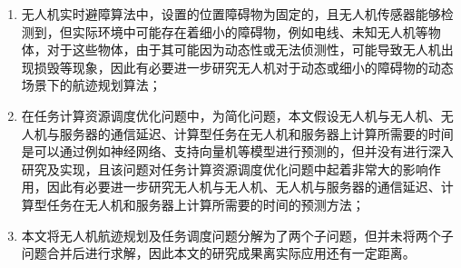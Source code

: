 \begin{enumerate}[leftmargin=2em]
    \item {无人机实时避障算法中，设置的位置障碍物为固定的，且无人机传感器能够检测到，但实际环境中可能存在着细小的障碍物，例如电线、未知无人机等物体，对于这些物体，由于其可能因为动态性或无法侦测性，可能导致无人机出现损毁等现象，因此有必要进一步研究无人机对于动态或细小的障碍物的动态场景下的航迹规划算法；}

    \item {在任务计算资源调度优化问题中，为简化问题，本文假设无人机与无人机、无人机与服务器的通信延迟、计算型任务在无人机和服务器上计算所需要的时间是可以通过例如神经网络、支持向量机等模型进行预测的，但并没有进行深入研究及实现，且该问题对任务计算资源调度优化问题中起着非常大的影响作用，因此有必要进一步研究无人机与无人机、无人机与服务器的通信延迟、计算型任务在无人机和服务器上计算所需要的时间的预测方法；}

    \item {本文将无人机航迹规划及任务调度问题分解为了两个子问题，但并未将两个子问题合并后进行求解，因此本文的研究成果离实际应用还有一定距离。}
\end{enumerate}

\newpage
